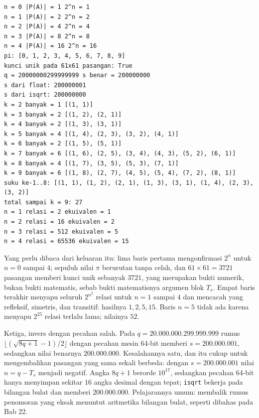 \begin{verbatim}
n = 0 |P(A)| = 1 2^n = 1
n = 1 |P(A)| = 2 2^n = 2
n = 2 |P(A)| = 4 2^n = 4
n = 3 |P(A)| = 8 2^n = 8
n = 4 |P(A)| = 16 2^n = 16
pi: [0, 1, 2, 3, 4, 5, 6, 7, 8, 9]
kunci unik pada 61x61 pasangan: True
q = 20000000299999999 s benar = 200000000
s dari float: 200000001
s dari isqrt: 200000000
k = 2 banyak = 1 [(1, 1)]
k = 3 banyak = 2 [(1, 2), (2, 1)]
k = 4 banyak = 2 [(1, 3), (3, 1)]
k = 5 banyak = 4 [(1, 4), (2, 3), (3, 2), (4, 1)]
k = 6 banyak = 2 [(1, 5), (5, 1)]
k = 7 banyak = 6 [(1, 6), (2, 5), (3, 4), (4, 3), (5, 2), (6, 1)]
k = 8 banyak = 4 [(1, 7), (3, 5), (5, 3), (7, 1)]
k = 9 banyak = 6 [(1, 8), (2, 7), (4, 5), (5, 4), (7, 2), (8, 1)]
suku ke-1..8: [(1, 1), (1, 2), (2, 1), (1, 3), (3, 1), (1, 4), (2, 3), (3, 2)]
total sampai k = 9: 27
n = 1 relasi = 2 ekuivalen = 1
n = 2 relasi = 16 ekuivalen = 2
n = 3 relasi = 512 ekuivalen = 5
n = 4 relasi = 65536 ekuivalen = 15
\end{verbatim}

Yang perlu dibaca dari keluaran itu: lima baris pertama mengonfirmasi $2^{n}$ untuk
$n = 0$ sampai $4$; sepuluh nilai $\pi$ berurutan tanpa celah, dan $61 \times 61 =
3721$ pasangan memberi kunci unik sebanyak $3721$, yang merupakan bukti numerik, bukan
bukti matematis, sebab bukti matematisnya argumen blok $T_s$. Empat baris terakhir
menyapu seluruh $2^{n^{2}}$ relasi untuk $n = 1$ sampai $4$ dan mencacah yang
refleksif, simetris, dan transitif: hasilnya $1, 2, 5, 15$. Baris $n = 5$ tidak ada
karena menyapu $2^{25}$ relasi terlalu lama; nilainya $52$.

Ketiga, invers dengan pecahan salah. Pada $q = 20.000.000.299.999.999$ rumus
$\lfloor (\sqrt{8q+1}-1)/2 \rfloor$ dengan pecahan mesin 64-bit memberi
$s = 200.000.001$, sedangkan nilai benarnya $200.000.000$. Kesalahannya satu, dan itu
cukup untuk mengembalikan pasangan yang sama sekali berbeda: dengan $s = 200.000.001$
nilai $n = q - T_s$ menjadi negatif. Angka $8q+1$ berorde $10^{17}$, sedangkan pecahan
64-bit hanya menyimpan sekitar $16$ angka desimal dengan tepat; \texttt{isqrt} bekerja
pada bilangan bulat dan memberi $200.000.000$. Pelajarannya umum: membalik rumus
penomoran yang eksak menuntut aritmetika bilangan bulat, seperti dibahas pada Bab 22.

